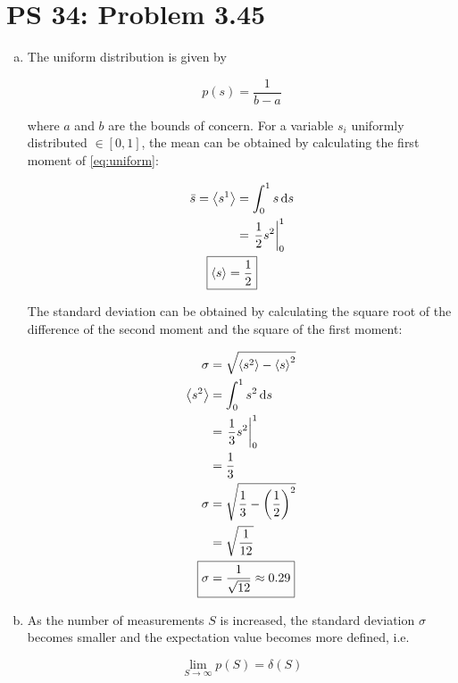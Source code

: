 \documentclass[12pt,a4paper,twocolumn]{article}
\begin{document}
\setcounter{page}{1}

\section*{PS 34: Problem 3.45}
\bigskip

\begin{enumerate}[(a)]

\item The uniform distribution is given by

\begin{equation}\label{eq:uniform}
	p(s) = \frac{1}{b-a}
\end{equation}

where $a$ and $b$ are the bounds of concern. For a variable $s_i$ uniformly distributed $\in [0,1]$, the mean can be obtained by calculating the first moment of \eqref{eq:uniform}:

\begin{align}
	\bar{s} = \ev{s^1} &= \int_0^1 s \dd{s} \\
	&= \eval{\frac{1}{2}s^2}_0^1 \nonumber \\
	\Aboxed{
		\ev{s} &= \frac{1}{2} \label{eq:answer-a-mean}
	}
\end{align}

The standard deviation can be obtained by calculating the square root of the difference of the second moment and the square of the first moment:

\begin{align}
	\sigma &= \sqrt{\ev{s^2} - \ev{s}^2} \label{eq:variance} \\
	\ev{s^2} &= \int_0^1 s^2 \dd{s} \\
	&= \eval{\frac{1}{3}s^2}_0^1 \nonumber \\
	&= \frac{1}{3} \\
	\sigma &= \sqrt{\frac{1}{3} - \qty(\frac{1}{2})^2} \nonumber \\
	&= \sqrt{\frac{1}{12}} \nonumber \\
	\Aboxed{
		\sigma &= \frac{1}{\sqrt{12}} \approx 0.29
	} \label{eq:answer-a-sd}
\end{align}

\item As the number of measurements $S$ is increased, the standard deviation $\sigma$ becomes smaller and the expectation value becomes more defined, i.e.

\begin{equation}\label{eq:answer-b}
	\boxed{
		\lim_{S \rightarrow \infty} p(S) = \delta (S)
	}
\end{equation}


\end{enumerate}
\end{document}
